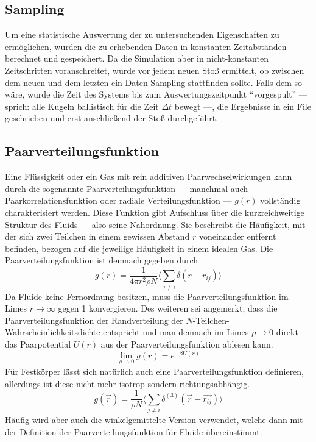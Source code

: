
\subsection{Sampling}
Um eine statistische Auswertung der zu untersuchenden Eigenschaften zu ermöglichen, wurden die zu erhebenden Daten in konstanten Zeitabständen berechnet und gespeichert. Da die Simulation aber in nicht-konstanten Zeitschritten voranschreitet, wurde vor jedem neuen Stoß ermittelt, ob zwischen dem neuen und dem letzten ein Daten-Sampling stattfinden sollte. Falls dem so wäre, wurde die Zeit des Systems bis zum Auswertungszeitpunkt ``vorgespult'' --- sprich: alle Kugeln ballistisch für die Zeit $\Delta t$ bewegt ---, die Ergebnisse in ein File geschrieben und erst anschließend der Stoß durchgeführt.   
\subsection{Paarverteilungsfunktion}\label{sec:paarverteilung}
Eine Flüssigkeit oder ein Gas mit rein additiven Paarwechselwirkungen kann durch die sogenannte Paarverteilungsfunktion --- manchmal auch Paarkorrelationsfunktion oder radiale Verteilungsfunktion --- $g(r)$ vollständig charakterisiert werden. Diese Funktion gibt Aufschluss über die kurzreichweitige Struktur des Fluids --- also seine Nahordnung. Sie beschreibt die Häufigkeit, mit der sich zwei Teilchen in einem gewissen Abstand $r$ voneinander entfernt befinden, bezogen auf die jeweilige Häufigkeit in einem idealen Gas. Die Paarverteilungsfunktion ist demnach gegeben durch
\begin{equation}
g(r) = \frac{1}{4\pi r^2 \rho N} \langle \sum_{j\neq i} \delta(r-r_{ij}) \rangle
\end{equation}   
Da Fluide keine Fernordnung besitzen, muss die Paarverteilungsfunktion im Limes $r \rightarrow \infty$ gegen 1 konvergieren. Des weiteren sei angemerkt, dass die Paarverteilungsfunktion der Randverteilung der $N$-Teilchen-Wahrscheinlichkeitsdichte entspricht und man demnach im Limes $\rho \rightarrow 0$ direkt das Paarpotential $U(r)$ aus der Paarverteilungsfunktion ablesen kann.  
\begin{equation}
\lim_{\rho \rightarrow 0} g(r) = e^{-\beta U(r)}
\end{equation}
Für Festkörper lässt sich natürlich auch eine Paarverteilungsfunktion definieren, allerdings ist diese nicht mehr isotrop sondern richtungsabhängig. 
\begin{equation}
g(\vec{r}) = \frac{1}{\rho N} \langle \sum_{j\neq i} \delta^{(3)}(\vec{r}-\vec{r_{ij}}) \rangle
\end{equation} 
Häufig wird aber auch die winkelgemittelte Version verwendet, welche dann mit der Definition der Paarverteilungsfunktion für Fluide übereinstimmt. 

